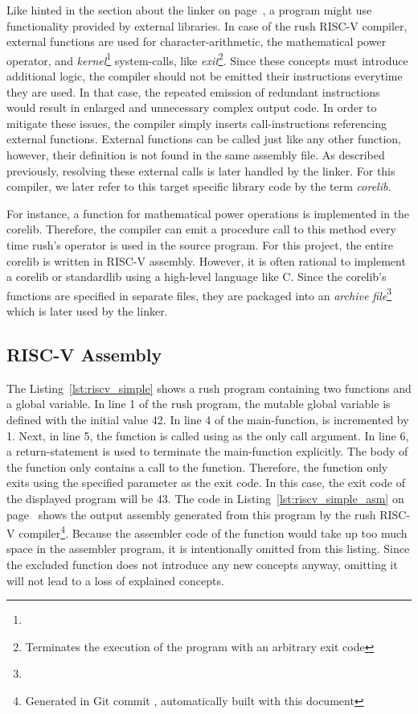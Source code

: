 Like hinted in the section about the linker on page~\pageref{sec:linker},
a program might use functionality provided by external libraries.
In case of the rush RISC-V compiler, external functions are used for character-arithmetic,
the mathematical power operator, and \emph{kernel}\footnote{} system-calls,
like \emph{exit}\footnote{Terminates the execution of the program with an arbitrary exit code}.
Since these concepts must introduce additional logic, the compiler should not be emitted their instructions everytime they are used.
In that case, the repeated emission of redundant instructions would result in enlarged and unnecessary complex output code.
In order to mitigate these issues, the compiler simply inserts call-instructions referencing external functions.
External functions can be called just like any other function, however, their definition is not found in the same assembly file.
As described previously, resolving these external calls is later handled by the linker.
For this compiler, we later refer to this target specific library code by the term \emph{corelib}.

For instance, a function for mathematical power operations is implemented in the corelib.
Therefore, the compiler can emit a procedure call to this method every time rush's \qVerb{**} operator is used in the source program.
For this project, the entire corelib is written in RISC-V assembly.
However, it is often rational to implement a corelib or standardlib using a high-level language like C.
Since the corelib's functions are specified in separate files, they are packaged into an \emph{archive file}\footnote{} which is later used by the linker.

\subsection{RISC-V Assembly}

The Listing~\ref{lst:riscv_simple} shows a rush program containing two functions and a global variable.
In line 1 of the rush program, the mutable global variable  is defined with the initial value 42.
In line 4 of the main-function,  is incremented by 1.
Next, in line 5, the  function is called using  as the only call argument.
In line 6, a return-statement is used to terminate the main-function explicitly.
The body of the  function only contains a call to the  function.
Therefore, the  function only exits using the specified parameter  as the exit code.
In this case, the exit code of the displayed program will be 43.
The code in Listing~\ref{lst:riscv_simple_asm} on page~\pageref{lst:riscv_simple_asm} shows the output assembly generated from this program by the rush RISC-V compiler\footnote{Generated in Git commit \rushCommit, automatically built with this document}.
Because the assembler code of the  function would take up too much space in the assembler program, it is intentionally omitted from this listing.
Since the excluded function does not introduce any new concepts anyway, omitting it will not lead to a loss of explained concepts.

